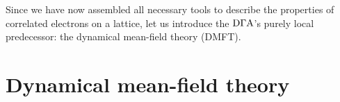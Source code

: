 \documentclass[../../main.tex]{subfiles}
\begin{document}
\\\\
Since we have now assembled all necessary tools to describe the properties of correlated electrons on a lattice, let us introduce the $\text{D}\Gamma\text{A}$'s purely local predecessor: the dynamical mean-field theory (DMFT).

\section{Dynamical mean-field theory}\label{sec:dmft}
\end{document}
